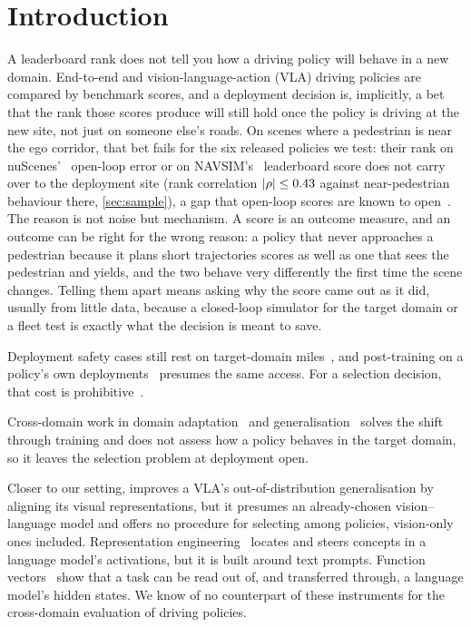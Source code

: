 \section{Introduction}
\label{sec:intro}
A leaderboard rank does not tell you how a driving policy will behave in a new domain. End-to-end and vision-language-action (VLA) driving policies are compared by benchmark scores, and a deployment decision is, implicitly, a bet that the rank those scores produce will still hold once the policy is driving at the new site, not just on someone else's roads.
On scenes where a pedestrian is near the ego corridor, that bet fails for the six released policies we test: their rank on nuScenes'~\cite{caesar2020nuscenes} open-loop error or on NAVSIM's~\cite{dauner2024navsim} leaderboard score does not carry over to the deployment site (rank correlation $|\rho|\le0.43$ against near-pedestrian behaviour there, \cref{sec:sample}), a gap that open-loop scores are known to open~\cite{zhao2026bridgesim,li2024egostatus,codevilla2019exploring}. The reason is not noise but mechanism. A score is an outcome measure, and an outcome can be right for the wrong reason: a policy that never approaches a pedestrian because it plans short trajectories scores as well as one that sees the pedestrian and yields, and the two behave very differently the first time the scene changes. Telling them apart means asking why the score came out as it did, usually from little data, because a closed-loop simulator for the target domain or a fleet test is exactly what the decision is meant to save.

Deployment safety cases still rest on target-domain miles~\cite{kusano2025waymo56m}, and post-training on a policy's own deployments~\cite{pi2025pistar06} presumes the same access. For a selection decision, that cost is prohibitive~\cite{kalra2016driving}.

Cross-domain work in domain adaptation~\cite{ganin2015dann} and generalisation~\cite{gulrajani2021lost}
solves the shift through training and does not assess how a policy behaves in the target domain, so
it leaves the selection problem at deployment open.

Closer to our setting, \cite{kachaev2025don} improves a VLA's out-of-distribution generalisation by
aligning its visual representations, but it presumes an already-chosen vision--language model and
offers no procedure for selecting among policies, vision-only ones included. Representation engineering~\cite{zou2023repe} locates and steers concepts in a language model's activations, but it is built around text prompts. Function
vectors~\cite{todd2024functionvectorslargelanguage} show that a task can be read out of, and
transferred through, a language model's hidden states. We know of no counterpart of these instruments for the cross-domain evaluation of driving policies.

